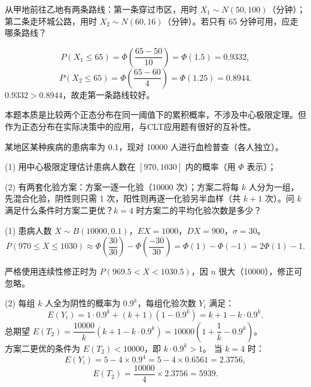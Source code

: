 ﻿\documentclass[lang=cn,11pt]{elegantbook}
\begin{document}
\begin{exercise}\label{exer:5-normal-route}
从甲地前往乙地有两条路线：第一条穿过市区，用时 \(X_1 \sim N(50, 100)\)（分钟）；第二条走环城公路，用时 \(X_2 \sim N(60, 16)\)（分钟）。若只有 65 分钟可用，应走哪条路线？
\end{exercise}
\begin{solution}
\[
P(X_1 \leq 65) = \Phi\!\left(\frac{65-50}{10}\right) = \Phi(1.5) = 0.9332,
\]
\[
P(X_2 \leq 65) = \Phi\!\left(\frac{65-60}{4}\right) = \Phi(1.25) = 0.8944.
\]
\(0.9332 > 0.8944\)，故走第一条路线较好。
\begin{note}
本题本质是比较两个正态分布在同一阈值下的累积概率，不涉及中心极限定理。但作为正态分布在实际决策中的应用，与CLT应用题有很好的互补性。
\end{note}
\end{solution}


\begin{exercise}\label{exer:5-clt-blood}
某地区某种疾病的患病率为 0.1，现对 10000 人进行血检普查（各人独立）。\par
(1) 用中心极限定理估计患病人数在 \([970, 1030]\) 内的概率（用 \(\Phi\) 表示）；\par
(2) 有两套化验方案：方案一逐一化验（10000 次）；方案二将每 \(k\) 人分为一组，先混合化验，阴性则只需 1 次，阳性则再逐一化验另半血样（共 \(k+1\) 次）。问 \(k\) 满足什么条件时方案二更优？\(k = 4\) 时方案二的平均化验次数是多少？
\end{exercise}
\begin{solution}
(1) 患病人数 \(X \sim B(10000, 0.1)\)，\(EX = 1000\)，\(DX = 900\)，\(\sigma = 30\)。
\[
P(970 \leq X \leq 1030) \approx \Phi\!\left(\frac{30}{30}\right) - \Phi\!\left(\frac{-30}{30}\right) = \Phi(1) - \Phi(-1) = 2\Phi(1) - 1.
\]
\begin{note}
严格使用连续性修正时为 \(P(969.5 < X < 1030.5)\)，因 \(n\) 很大（10000），修正可忽略。
\end{note}
(2) 每组 \(k\) 人全为阴性的概率为 \(0.9^k\)，每组化验次数 \(Y_i\) 满足：
\[
E(Y_i) = 1 \cdot 0.9^k + (k+1)(1-0.9^k) = k + 1 - k \cdot 0.9^k.
\]
总期望 \(E(T_2) = \dfrac{10000}{k}(k+1-k \cdot 0.9^k) = 10000\!\left(1 + \dfrac{1}{k} - 0.9^k\right)\)。\\
方案二更优的条件为 \(E(T_2) < 10000\)，即 \(k \cdot 0.9^k > 1\)。
当 \(k = 4\) 时：
\[
E(Y_i) = 5 - 4 \times 0.9^4 = 5 - 4 \times 0.6561 = 2.3756,
\]
\[
E(T_2) = \frac{10000}{4} \times 2.3756 = 5939.
\]
\end{solution}
\end{document}
